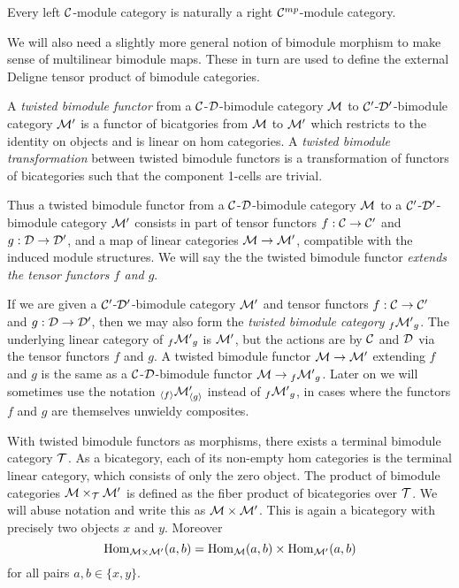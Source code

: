 \documentclass{amsart}
\begin{document}
\begin{remark}
 	Every left $\mathcal C$-module category is naturally a right $\mathcal C^{mp}$-module category. 
\end{remark}

We will also need a slightly more general notion of bimodule morphism to make sense of multilinear bimodule maps. These in turn are used to define the external Deligne tensor product of bimodule categories. 

\begin{definition}
	A {\em twisted bimodule functor} from a $\mathcal C$-$\mathcal D$-bimodule category $\mathcal M$  to $\mathcal C'$-$\mathcal D'$-bimodule category $\mathcal M'$ is a functor of bicatgories from $\mathcal M$ to $\mathcal M'$ which restricts to the identity on objects and is linear on hom categories. A {\em twisted bimodule transformation} between twisted bimodule functors is a transformation of functors of bicategories such that the component 1-cells are trivial.
\end{definition}

Thus a twisted bimodule functor from a $\mathcal C$-$\mathcal D$-bimodule category $\mathcal M$ to a $\mathcal C'$-$\mathcal D'$-bimodule category $\mathcal M'$ consists in part of tensor functors $f:\mathcal C \to \mathcal C'$ and $g:\mathcal D \to \mathcal D'$, and a map of linear categories $\mathcal M \to \mathcal M'$, compatible with the induced module structures. We will say the the twisted bimodule functor {\em extends the tensor functors $f$ and $g$}. 

If we are given a $\mathcal C'$-$\mathcal D'$-bimodule category $\mathcal M'$ and tensor functors $f:\mathcal C \to \mathcal C'$ and $g:\mathcal D \to \mathcal D'$, then we may also form the {\em twisted bimodule category} ${}_f{\mathcal M'}_g$.  The underlying linear category of ${}_f{\mathcal M'}_g$ is $\mathcal M'$, but the actions are by $\mathcal C$ and $\mathcal D$ via the tensor functors $f$ and $g$. A twisted bimodule functor $\mathcal M \to \mathcal M'$ extending $f$ and $g$ is the same as a $\mathcal C$-$\mathcal D$-bimodule functor $\mathcal M \to {}_f{\mathcal M'}_g$.  Later on we will sometimes use the notation ${}_{\langle f \rangle} \mathcal M'_{\langle g \rangle}$ instead of ${}_f{\mathcal M'}_g$, in cases where the functors $f$ and $g$ are themselves unwieldy composites.

With twisted bimodule functors as morphisms, there exists a terminal bimodule category $\mathcal T$. As a bicategory, each of its non-empty hom categories is the terminal linear category, which consists of only the zero object. %
The product of bimodule categories $\mathcal M \times_{\mathcal T} \mathcal M'$ is defined as the fiber product of bicategories over $\mathcal T$.     We will abuse notation and write this as $\mathcal M \times \mathcal M'$. This is again a bicategory with precisely two objects $x$ and $y$. Moreover
\begin{equation*}
	\operatorname{Hom}_{\mathcal M \times \mathcal M'}(a,b) = \operatorname{Hom}_\mathcal M(a,b) \times \operatorname{Hom}_{\mathcal M'}(a,b)
\end{equation*}
for all pairs $a,b \in \{ x,y \}$.
\end{document}
